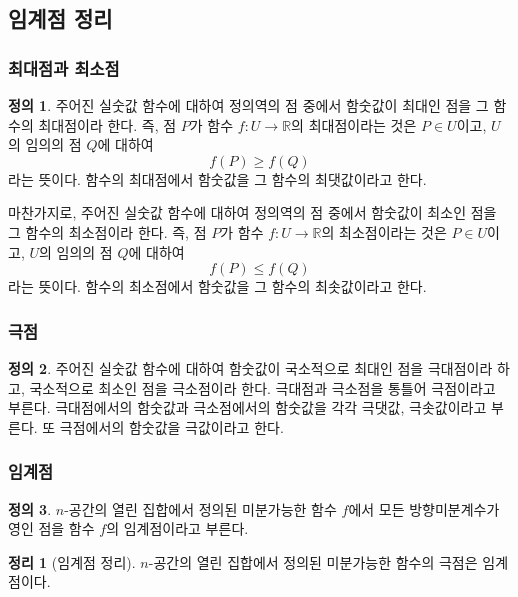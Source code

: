 \documentclass[unfonts,oneside,a4paper]{oblivoir}
\theoremstyle{definition}
\newtheorem{definition}{정의}[subsubsection]
\theoremstyle{theorem}
\newtheorem{theorem}{정리}[subsubsection]
\begin{document}
\subsection{임계점 정리}
\subsubsection{최대점과 최소점}

\begin{definition}
    주어진 실숫값 함수에 대하여 정의역의 점 중에서 함숫값이 최대인 점을 그 함수의 최대점이라 한다.
    즉, 점 $P$가 함수 $f: U \rightarrow \mathbb R$의 최대점이라는 것은 $P \in U$이고, $U$의 임의의 점 $Q$에 대하여
    \begin{equation*}
        f(P) \geq f(Q)
    \end{equation*}
    라는 뜻이다.
    함수의 최대점에서 함숫값을 그 함수의 최댓값이라고 한다.

    마찬가지로, 주어진 실숫값 함수에 대하여 정의역의 점 중에서 함숫값이 최소인 점을 그 함수의 최소점이라 한다.
    즉, 점 $P$가 함수 $f: U \rightarrow \mathbb R$의 최소점이라는 것은 $P \in U$이고, $U$의 임의의 점 $Q$에 대하여
    \begin{equation*}
        f(P) \leq f(Q)
    \end{equation*}
    라는 뜻이다.
    함수의 최소점에서 함숫값을 그 함수의 최솟값이라고 한다.
\end{definition}

\subsubsection{극점}
\begin{definition}
    주어진 실숫값 함수에 대하여 함숫값이 국소적으로 최대인 점을 극대점이라 하고, 국소적으로 최소인 점을 극소점이라 한다.
    극대점과 극소점을 통틀어 극점이라고 부른다.
    극대점에서의 함숫값과 극소점에서의 함숫값을 각각 극댓값, 극솟값이라고 부른다.
    또 극점에서의 함숫값을 극값이라고 한다.
\end{definition}

\subsubsection{임계점}
\begin{definition}
    $n$-공간의 열린 집합에서 정의된 미분가능한 함수 $f$에서 모든 방향미분계수가 영인 점을 함수 $f$의 임계점이라고 부른다.
\end{definition}

\begin{theorem}[임계점 정리]
    $n$-공간의 열린 집합에서 정의된 미분가능한 함수의 극점은 임계점이다.
\end{theorem}
\end{document}
